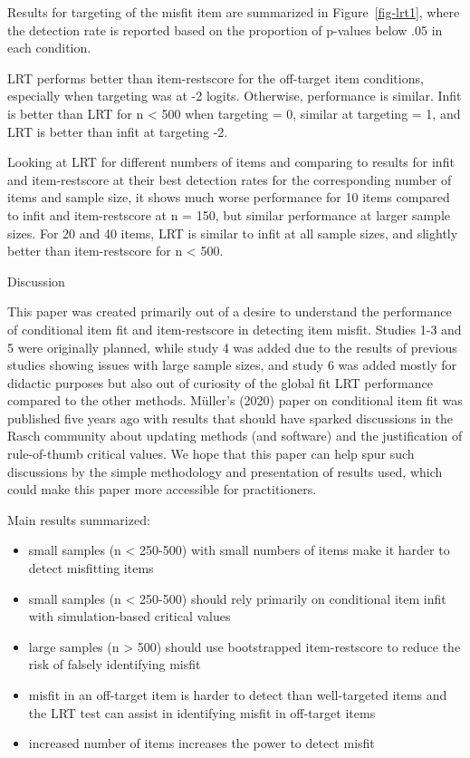 \documentclass[
  letterpaper,
  DIV=11,
  numbers=noendperiod]{scrartcl}
\providecommand{\tightlist}{%
  \setlength{\itemsep}{0pt}\setlength{\parskip}{0pt}}\usepackage{longtable,booktabs,array}
\begin{document}
Results for targeting of the misfit item are summarized in
Figure~\ref{fig-lrt1}, where the detection rate is reported based on the
proportion of p-values below .05 in each condition.

LRT performs better than item-restscore for the off-target item
conditions, especially when targeting was at -2 logits. Otherwise,
performance is similar. Infit is better than LRT for n \textless{} 500
when targeting = 0, similar at targeting = 1, and LRT is better than
infit at targeting -2.

Looking at LRT for different numbers of items and comparing to results
for infit and item-restscore at their best detection rates for the
corresponding number of items and sample size, it shows much worse
performance for 10 items compared to infit and item-restscore at n =
150, but similar performance at larger sample sizes. For 20 and 40
items, LRT is similar to infit at all sample sizes, and slightly better
than item-restscore for n \textless{} 500.

Discussion

This paper was created primarily out of a desire to understand the
performance of conditional item fit and item-restscore in detecting item
misfit. Studies 1-3 and 5 were originally planned, while study 4 was
added due to the results of previous studies showing issues with large
sample sizes, and study 6 was added mostly for didactic purposes but
also out of curiosity of the global fit LRT performance compared to the
other methods. Müller's (2020) paper on conditional item fit was
published five years ago with results that should have sparked
discussions in the Rasch community about updating methods (and software)
and the justification of rule-of-thumb critical values. We hope that
this paper can help spur such discussions by the simple methodology and
presentation of results used, which could make this paper more
accessible for practitioners.

Main results summarized:

\begin{itemize}
\tightlist
\item
  small samples (n \textless{} 250-500) with small numbers of items make
  it harder to detect misfitting items
\item
  small samples (n \textless{} 250-500) should rely primarily on
  conditional item infit with simulation-based critical values
\item
  large samples (n \textgreater{} 500) should use bootstrapped
  item-restscore to reduce the risk of falsely identifying misfit
\item
  misfit in an off-target item is harder to detect than well-targeted
  items and the LRT test can assist in identifying misfit in off-target
  items
\item
  increased number of items increases the power to detect misfit
\end{itemize}
\end{document}
